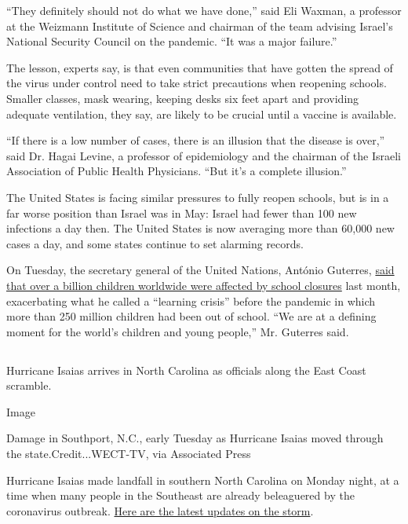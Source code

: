 ``They definitely should not do what we have done,'' said Eli Waxman, a
professor at the Weizmann Institute of Science and chairman of the team
advising Israel's National Security Council on the pandemic. ``It was a
major failure.''

The lesson, experts say, is that even communities that have gotten the
spread of the virus under control need to take strict precautions when
reopening schools. Smaller classes, mask wearing, keeping desks six feet
apart and providing adequate ventilation, they say, are likely to be
crucial until a vaccine is available.

``If there is a low number of cases, there is an illusion that the
disease is over,'' said Dr. Hagai Levine, a professor of epidemiology
and the chairman of the Israeli Association of Public Health Physicians.
``But it's a complete illusion.''

The United States is facing similar pressures to fully reopen schools,
but is in a far worse position than Israel was in May: Israel had fewer
than 100 new infections a day then. The United States is now averaging
more than 60,000 new cases a day, and some states continue to set
alarming records.

On Tuesday, the secretary general of the United Nations, António
Guterres,
\href{https://twitter.com/antonioguterres/status/1290500206572666881}{said
that over a billion children worldwide were affected by school closures}
last month, exacerbating what he called a ``learning crisis'' before the
pandemic in which more than 250 million children had been out of school.
``We are at a defining moment for the world's children and young
people,'' Mr. Guterres said.

\hypertarget{-2}{%
\subsection{}\label{-2}}

Hurricane Isaias arrives in North Carolina as officials along the East
Coast scramble.

Image

Damage in Southport, N.C., early Tuesday as Hurricane Isaias moved
through the state.Credit...WECT-TV, via Associated Press

Hurricane Isaias made landfall in southern North Carolina on Monday
night, at a time when many people in the Southeast are already
beleaguered by the coronavirus outbreak.
\href{https://www.nytimes3xbfgragh.onion/2020/08/03/us/isaias-storm-updates.html}{Here
are the latest updates on the storm}.

